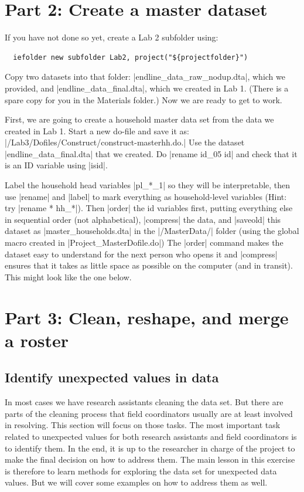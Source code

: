 \documentclass{tufte-handout}
\begin{document}
\section{Part 2: Create a master dataset}

If you have not done so yet, create a Lab 2 subfolder using:
\begin{Verbatim}
  iefolder new subfolder Lab2, project("${projectfolder}")
\end{Verbatim}
Copy two datasets into that folder:
|endline_data_raw_nodup.dta|, which we provided, and
|endline_data_final.dta|, which we created in Lab 1.
(There is a spare copy for you in the Materials folder.)
Now we are ready to get to work.

First, we are going to create a household master data set
from the data we created in Lab 1.
Start a new do-file and save it as:
|/Lab3/Dofiles/Construct/construct-masterhh.do.|
Use the dataset |endline_data_final.dta| that we created.
Do |rename id_05 id| and check that it is an ID variable using |isid|.

Label the household head variables |pl_*_1| so they will be interpretable,
then use |rename| and |label| to mark everything as household-level variables
(Hint: try |rename * hh_*|). Then |order| the id variables first,
putting everything else in sequential order (not alphabetical),
|compress| the data, and |saveold| this dataset as
|master_households.dta| in the |/MasterData/| folder
(using the global macro created in |Project_MasterDofile.do|)
The |order| command makes the dataset easy to understand
for the next person who opens it
and |compress| ensures that it takes as little space as possible
on the computer (and in transit).
This might look like the one below.

\section{Part 3: Clean, reshape, and merge a roster}

\subsection{Identify unexpected values in data}

In most cases we have research assistants cleaning the data set.
But there are parts of the cleaning process
that field coordinators usually are at least involved in resolving.
This section will focus on those tasks.
The most important task related to unexpected values
for both research assistants and field coordinators is to identify them.
In the end, it is up to the researcher in charge of the project
to make the final decision on how to address them.
The main lesson in this exercise is therefore to learn
methods for exploring the data set for unexpected data values.
But we will cover some examples on how to address them as well.
\end{document}
